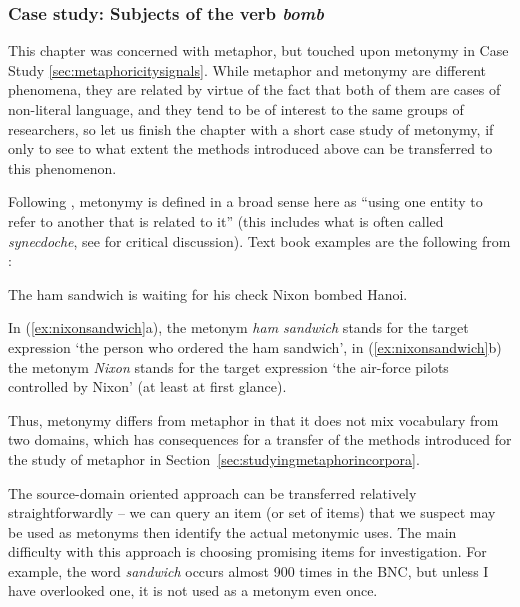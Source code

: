 \subsubsection{Case study: Subjects of the verb \textit{bomb}}
\label{sec:subjectsoftheverbbomb}

This chapter was concerned with metaphor,  but touched upon metonymy  in Case Study \ref{sec:metaphoricitysignals}. While metaphor and metonymy are different phenomena, they are related by virtue of the fact that both of them are cases of non\hyp{}literal language, and they tend to be of interest to the same groups of researchers, so let us finish the chapter with a short case study of metonymy, if only to see to what extent the methods introduced above can be transferred to this phenomenon.

Following \citet[35]{lakoff_metaphors_1980}, metonymy  is defined in a broad sense here as ``using one entity to refer to another that is related to it'' (this includes what is often called \textit{synecdoche}, see \citet{panther_distinguishing_1999} for critical discussion). Text book examples are the following from \citet[35, 39]{lakoff_metaphors_1980}:

\begin{exe}
\ex
\begin{xlist}
\label{ex:nixonsandwich}
\ex The ham sandwich is waiting for his check
\ex Nixon bombed Hanoi.
\end{xlist}
\end{exe}

In (\ref{ex:nixonsandwich}a), the metonym  \textit{ham sandwich} stands for the target expression `the person who ordered the ham sandwich', in (\ref{ex:nixonsandwich}b) the metonym \textit{Nixon} stands for the target expression `the air\hyp{}force pilots controlled by Nixon' (at least at first glance).

Thus, metonymy  differs from metaphor  in that it does not mix vocabulary from two domains, which has consequences for a transfer of the methods introduced for the study of metaphor in Section~\ref{sec:studyingmetaphorincorpora}.

The source\hyp{}domain oriented approach can be transferred relatively straightforwardly -- we can query an item (or set of items) that we suspect may be used as metonyms  then identify the actual metonymic uses. The main difficulty with this approach is choosing promising items for investigation. For example, the word \textit{sandwich} occurs almost 900 times in the BNC,  but unless I have overlooked one, it is not used as a metonym even once.

